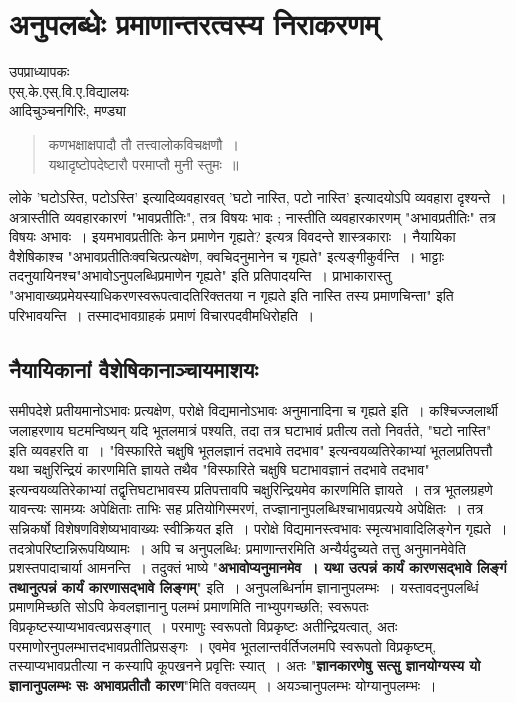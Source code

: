 {\fontsize{15}{17}\selectfont
\presetvalues
\chapter{अनुपलब्धेः प्रमाणान्तरत्वस्य निराकरणम्}

\begin{center}
\smallskip

उपप्राध्यापकः\\
एस्.के.एस्.वि.ए.विद्यालयः\\
आदिचुञ्चनगिरिः, मण्ड्या
\addrule
\end{center}

\begin{verse}
कणभक्षाक्षपादौ तौ तत्त्वालोकविचक्षणौ~। \\
यथादृष्टोपदेष्टारौ परमाप्तौ मुनी स्तुमः~॥
\end{verse}
लोके  'घटोऽस्ति, पटोऽस्ति' इत्यादिव्यवहारवत् 'घटो नास्ति, पटो नास्ति' इत्यादयोऽपि व्यवहारा दृश्यन्ते~। अत्रास्तीति व्यवहारकारणं "भावप्रतीतिः", तत्र विषयः भावः ; नास्तीति व्यवहारकारणम् "अभावप्रतीतिः" तत्र विषयः अभावः~। इयमभावप्रतीतिः केन प्रमाणेन \-गृह्यते? इत्यत्र विवदन्ते शास्त्रकाराः~। नैयायिका वैशेषिकाश्च "अभावप्रतीतिः\break क्वचित्प्रत्यक्षेण, क्वचिदनुमानेन च गृह्यते" इत्यङ्गीकुर्वन्ति~। भाट्टाः तदनुयायिनश्च\break "अभावोऽनुपलब्धिप्रमाणेन गृह्यते" इति प्रतिपादयन्ति~। प्राभाकारास्तु "अभावाख्य\-प्रमेयस्याधिकरणस्वरूपत्वादतिरिक्ततया न गृह्यते इति नास्ति तस्य प्रमाणचिन्ता" इति परिभावयन्ति~। तस्माद\-भावग्राहकं प्रमाणं विचारपदवीमधिरोहति~। 
 
\section*{नैयायिकानां वैशेषिकानाञ्चायमाशयः} 

समीपदेशे प्रतीयमानोऽभावः प्रत्यक्षेण, परोक्षे विद्यमानोऽभावः अनुमानादिना च गृह्यते इति~। कश्चिज्जलार्थी जलाहरणाय घटमन्विष्यन् यदि भूतलमात्रं पश्यति, तदा तत्र घटाभावं प्रतीत्य ततो निवर्तते, "घटो नास्ति" इति व्यवहरति वा~। "विस्फारिते चक्षुषि भूतलज्ञानं तदभावे तदभाव" इत्यन्वयव्यतिरेकाभ्यां भूतलप्रतिपत्तौ यथा चक्षुरिन्द्रियं कारणमिति ज्ञायते तथैव "विस्फारिते चक्षुषि घटाभावज्ञानं तदभावे तदभाव" इत्यन्वयव्यतिरेकाभ्यां तद्वृत्तिघटा\-भावस्य \-प्रतिपत्तावपि चक्षुरिन्द्रियमेव कारणमिति ज्ञायते~। तत्र भूतलग्रहणे यावन्त्यः सामग्र्यः अपे\-क्षिताः ताभिः सह प्रतियोगिस्मरणं, तज्ज्ञानानुपलब्धिश्चाभावप्रत्यये अपेक्षितः~। तत्र सन्नि\-कर्षो विशेषणविशेष्यभावाख्यः स्वीक्रियत इति~। परोक्षे विद्यमानस्त्वभावः स्मृत्यभावादिलिङ्गेन \-गृह्यते~। तदत्रोपरिष्टान्निरूपयिष्यामः~। अपि च अनुपलब्धि: प्रमाणान्तरमिति अन्यैर्य\-दुच्यते तत्तु अनुमानमेवेति प्रशस्तपादाचार्या आमनन्ति~। तदुक्तं भाष्ये "\textbf{अभावोप्यनुमान\-मेव~। यथा उत्पन्नं कार्यं कारणसद्भावे लिङ्गं तथानुत्पन्नं कार्यं कारणासद्भावे \-लिङ्गम्}" इति~। अनुपलब्धिर्नाम ज्ञानानुपलम्भः~। यस्तावदनुपलब्धिं प्रमाणमिच्छति सोऽपि केवल\-ज्ञानानु पलम्भं प्रमाणमिति नाभ्युपगच्छति; स्वरूपतः विप्रकृष्टस्याप्यभावत्वप्रसङ्गात्~। परमाणुः स्वरूपतो विप्रकृष्टः अतीन्द्रियत्वात्, अतः परमाणोरनुपलम्भात्तदभावप्रतीतिप्रसङ्गः~। एवमेव भूत\-लान्तर्वर्तिजलमपि स्वरूपतो विप्रकृष्टम्, तस्याप्यभावप्रतीत्या न कस्यापि कूपखनने \-प्रवृत्तिः स्यात्~। अतः "\textbf{ज्ञानकारणेषु सत्सु ज्ञानयोग्यस्य यो ज्ञानानुपलम्भः सः अभाव\-प्रतीतौ कारण}"मिति वक्तव्यम्~। अयञ्चानुपलम्भः योग्यानुपलम्भः~। 


}
